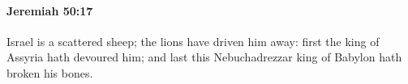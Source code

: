
		\paragraph{Jeremiah 50:17} %
			\label{JEREMIAH-50-17}

			Israel is a scattered sheep; the lions have driven him away: first the king of Assyria hath devoured him; and last this Nebuchadrezzar king of Babylon hath broken his bones.


